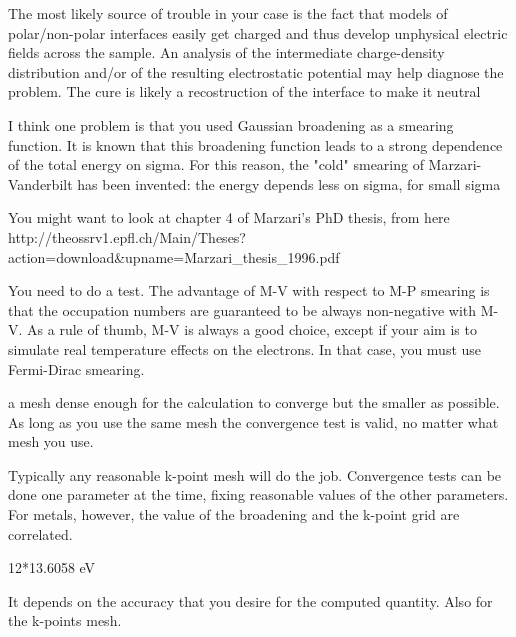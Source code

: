   The most likely source of trouble in your case is the fact that models of polar/non-polar interfaces easily get charged and thus develop unphysical electric fields across the sample. An analysis of the intermediate charge-density distribution and/or of the resulting electrostatic potential may help  diagnose the problem. The cure is likely a recostruction of the interface to make it neutral

  I think one problem is that you used Gaussian broadening as a smearing function. It is known that this broadening function leads to a strong dependence of the total energy on sigma. For this reason, the "cold" smearing of Marzari-Vanderbilt has been invented: the energy depends less on sigma, for small sigma

  You might want to look at chapter 4 of Marzari's PhD thesis, from here http://theossrv1.epfl.ch/Main/Theses?action=download\&upname=Marzari\_thesis\_1996.pdf


  You need to do a test. The advantage of M-V with respect to M-P smearing is that the occupation numbers are guaranteed to be always non-negative with M-V. As a rule of thumb, M-V is always a good choice, except if your aim is to simulate real temperature effects on the electrons. In that case, you must use Fermi-Dirac smearing.


  a mesh dense enough for the calculation to  converge but the smaller as possible. As long as you use the same mesh the convergence test is valid, no  matter what mesh you use.

  Typically any reasonable k-point mesh will do the job. Convergence tests can be done one parameter at the time, fixing reasonable values of the other parameters. For metals, however, the value of the broadening and the k-point grid are correlated.


  12*13.6058 eV


  It depends on the accuracy that you desire for the computed quantity. Also for the k-points mesh.

